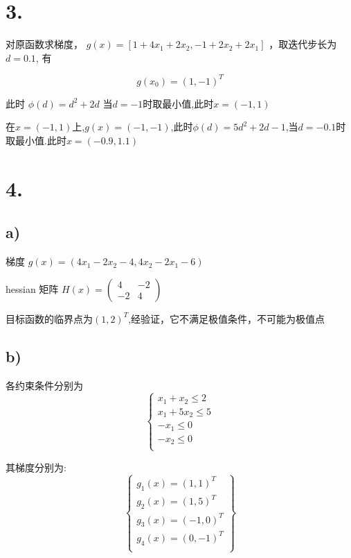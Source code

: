 \documentclass{article}
\begin{document}
	\section*{3.}

	对原函数求梯度， \(g(x) = [1+4x_1 + 2x_2, -1 +2x_2 + 2x_1]\) ，取迭代步长为$d=0.1$, 有

	\[g(x_0) =(1,-1)^T \]

	此时 \(\phi(d) =d^{2} + 2 d\) 当\(d = -1\)时取最小值,此时$x = (-1,1)$

	在$x= (-1,1)$上,$g(x) = (-1,-1)$,此时\(\phi(d) = 5 d^{2} + 2 d - 1\),当$d=-0.1$时取最小值.此时$x=(-0.9,1.1)$

	\section*{4.}

	\subsection*{a)}

	梯度 $g(x) = (4x_1 -2x_2 - 4,4x_2 -2x_1-6)$

	hessian 矩阵 \(H(x) = \left(\begin{matrix}
		4 & -2\\
		-2 & 4
	\end{matrix}\right)\)

	目标函数的临界点为$(1,2)^T$,经验证，它不满足极值条件，不可能为极值点

	\subsection*{b)}

	各约束条件分别为
	\[\left\{\begin{array}{c}
		x_1 + x_2 \leq 2 \\
		x_1 + 5x_2 \leq 5 \\
		-x_1 \leq 0 \\
		-x_2 \leq 0 \\
	\end{array}\right.\]

	其梯度分别为:
	\[\left\{
	\begin{array}{c}
		g_1(x) = (1,1)^T \\
		g_2(x) = (1,5) ^T\\
		g_3(x)=(-1,0)^T \\
		g_4(x) = (0,-1)^T\\
	\end{array}
	\right\}\]
\end{document}
